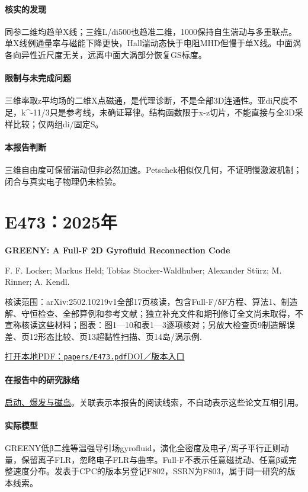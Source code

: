 \documentclass[UTF8,a4paper,11pt,openany,fontset=fandol]{ctexbook}
\begin{document}
\paragraph{核实的发现}同参二维均趋单X线；三维L/di500也趋准二维，1000保持自生湍动与多重联点。单X线例通量率与磁能下降更快，Hall湍动态快于电阻MHD但慢于单X线。中面涡各向异性近尺度无关，远离中面大涡部分恢复GS标度。

\paragraph{限制与未完成问题}三维率取z平均场的二维X点磁通，是代理诊断，不是全部3D连通性。亚di尺度不足，k\textasciicircum{}-11/3只是参考线，未确证幂律。结构函数限于x-z切片，不能直接与全3D采样比较；仅两组di/固定S。

\paragraph{本报告判断}三维自由度可保留湍动但非必然加速。Petschek相似仅几何，不证明慢激波机制；闭合与真实电子物理仍未检验。

\section{E473：2025年}\label{paper:E473}

\textbf{GREENY: A Full-F 2D Gyrofluid Reconnection Code}\citep{E473}\

F. F. Locker;  Markus Held;  Tobias Stocker-Waldhuber;  Alexander Stürz;  M. Rinner;  A. Kendl.

\textsf{核读范围：}arXiv:2502.10219v1全部17页核读，包含Full-F/δF方程、算法1、制造解、守恒检查、全部算例和参考文献；独立补充文件和期刊修订全文尚未取得，不宣称核读这些材料；\textsf{图表：}图1—10和表1—3逐项核对；另放大检查页9制造解误差、页12形态比较、页13超黏性扫描、页14岛/涡示例.

\href{run:../papers/E473.pdf}{打开本地PDF：\texttt{papers/E473.pdf}}\quad\href{https://doi.org/10.1016/j.cpc.2025.109807}{DOI／版本入口}

\paragraph{在报告中的研究脉络}\hyperref[story:onset]{启动、爆发与磁岛}。关联表示本报告的阅读线索，不自动表示这些论文互相引用。

\paragraph{实际模型}GREENY低β二维等温强导引场gyrofluid，演化全密度及电子/离子平行正则动量，保留离子FLR，忽略电子FLR与曲率。Full-F不表示任意磁扰动、任意β或完整速度分布。发表于CPC的版本另登记F802，SSRN为F803，属于同一研究的版本线索。
\end{document}
